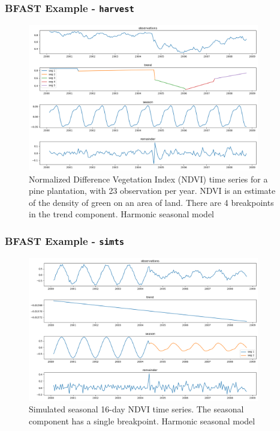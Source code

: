 \documentclass[presentation.tex]{subfiles}
\begin{document}
\begin{frame}
\frametitle{BFAST Example - \texttt{harvest}}
\begin{figure}[H]
  \centering
  \includegraphics[width=0.9\textwidth]{imgs/harvest.png}
  \caption{Normalized Difference Vegetation Index (NDVI) time series for a pine plantation,
    with 23 observation per year. NDVI is an estimate of the density of green on an area of land.
    There are 4 breakpoints in the trend component. Harmonic seasonal model}
\end{figure}
\end{frame}


\begin{frame}
\frametitle{BFAST Example - \texttt{simts}}
\begin{figure}[H]
  \centering
  \includegraphics[width=0.9\textwidth]{imgs/simts.png}
  \caption{Simulated seasonal 16-day NDVI time series. The seasonal
    component has a single breakpoint. Harmonic seasonal model}
\end{figure}
\end{frame}
\end{document}
